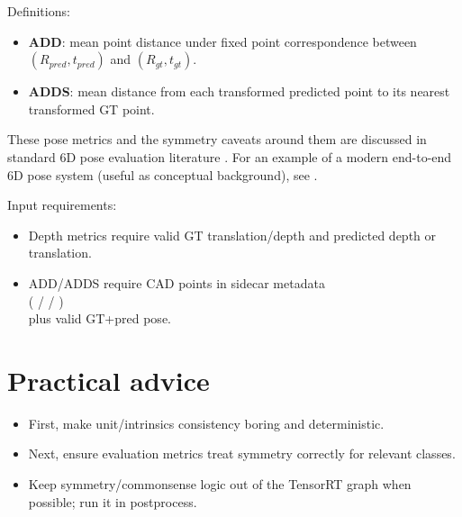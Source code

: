 Definitions:
\begin{itemize}
  \item \textbf{ADD}: mean point distance under fixed point correspondence between $(R_{pred}, t_{pred})$ and $(R_{gt}, t_{gt})$.
  \item \textbf{ADDS}: mean distance from each transformed predicted point to its nearest transformed GT point.
\end{itemize}

These pose metrics and the symmetry caveats around them are discussed in standard 6D pose evaluation literature \cite{hodan2016poseeval,hodan2020bop}.
For an example of a modern end-to-end 6D pose system (useful as conceptual background), see \cite{labbe2020cosypose}.

Input requirements:
\begin{itemize}
  \item Depth metrics require valid GT translation/depth and predicted depth or translation.
  \item ADD/ADDS require CAD points in sidecar metadata \\
    ( /  / ) \\
    plus valid GT+pred pose.
\end{itemize}

\section{Practical advice}
\begin{itemize}
  \item First, make unit/intrinsics consistency boring and deterministic.
  \item Next, ensure evaluation metrics treat symmetry correctly for relevant classes.
  \item Keep symmetry/commonsense logic out of the TensorRT graph when possible; run it in postprocess.
\end{itemize}
